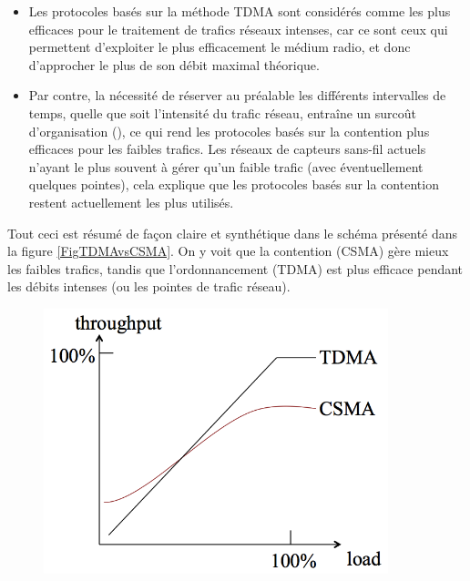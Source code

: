 \begin{itemize}

\item Les protocoles basés sur la méthode TDMA sont considérés comme les
plus efficaces pour le traitement de trafics réseaux intenses, car ce sont
ceux qui permettent d'exploiter le plus efficacement le médium radio, et
donc d'approcher le plus de son débit maximal théorique.

\item Par contre, la nécessité de réserver au préalable les différents
intervalles de temps, quelle que soit l'intensité du trafic réseau, entraîne
un surcoût d'organisation (), ce qui rend les protocoles
basés sur la contention plus efficaces pour les faibles trafics. Les réseaux
de capteurs sans-fil actuels n'ayant le plus souvent à gérer qu'un faible
trafic (avec éventuellement quelques pointes), cela explique que les
protocoles basés sur la contention restent actuellement les plus utilisés.

\end{itemize}

Tout ceci est résumé de façon claire et synthétique dans le schéma présenté
dans la figure \vref{FigTDMAvsCSMA}. On y voit que la contention (CSMA)
gère mieux les faibles trafics, tandis que l'ordonnancement (TDMA) est plus
efficace pendant les débits intenses (ou les pointes de trafic réseau).

\begin{figure}[!hbt]
\centering
\includegraphics[width=10cm]{images/ch3-tdma-vs-csma.png}
\label{FigTDMAvsCSMA}
\end{figure}


